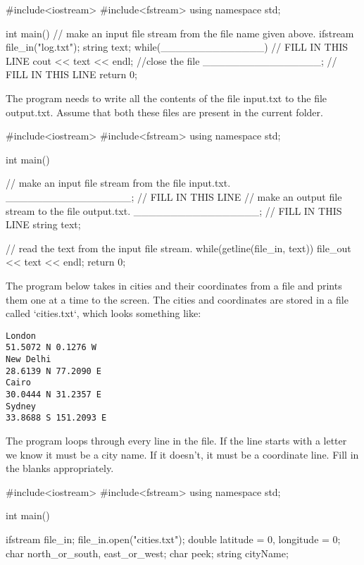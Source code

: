 {{%
#include<iostream>
#include<fstream>
using namespace std;

int main() 
{
    // make an input file stream from the file name given above.
    ifstream file_in("log.txt"); 
    string text;  
    while(______________) // FILL IN THIS LINE
    {      
        cout << text << endl;
    }
    //close the file
    ________________; // FILL IN THIS LINE
    return 0;
}
{%


\begin{problem}
    The program needs to write all the contents of the file input.txt to the file output.txt. Assume that both these files are present in the current folder.
\end{problem}

{%
#include<iostream>
#include<fstream>
using namespace std;

int main() 
{
    // make an input file stream from the file input.txt.
    _________________; // FILL IN THIS LINE
    // make an output file stream to the file output.txt.
    _________________; // FILL IN THIS LINE
    string text; 

    // read the text from the input file stream.
    while(getline(file_in, text))
    {
        file_out << text << endl;
    }
    return 0;
}
{%

\begin{problem}
    The program below takes in cities and their coordinates from a file and prints them one at a time to the screen. The cities and coordinates are stored in a file called `cities.txt`, which looks something like:

\begin{verbatim}
London
51.5072 N 0.1276 W
New Delhi
28.6139 N 77.2090 E
Cairo
30.0444 N 31.2357 E
Sydney
33.8688 S 151.2093 E
\end{verbatim}


The program loops through every line in the file. If the line starts with a letter we know it must be a city name. If it doesn't, it must be a coordinate line. Fill in the blanks appropriately.
\end{problem}

{%
#include<iostream>
#include<fstream>
using namespace std;

int main(){
    ifstream file_in;
    file_in.open("cities.txt");
    double latitude = 0, longitude = 0;
    char north_or_south, east_or_west;
    char peek;
    string cityName;

}}}}}}}
